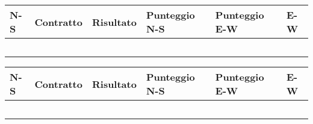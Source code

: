 \documentclass[a4paper,italian,12pt]{article}
\begin{document}
\begin{tcolorbox}
\begin{minipage}{.3\textwidth}
\newgame
{}

\hspace{-.2cm}\showAll
\end{minipage}
\begin{minipage}{.7\textwidth}

\renewcommand{\arraystretch}{2}
\begin{tabular}{|l|l|l|l|l|l|}
\hline
N-S & Contratto\hspace{1.5cm} & Risultato& Punteggio N-S & Punteggio E-W & E-W\\\hline
  &&&&&\\\hline
   &&&&&\\\hline
    &&&&&\\\hline
     &&&&&\\\hline
          &&&&&\\\hline
\end{tabular}
\end{minipage}
\end{tcolorbox}

\medskip

\begin{tcolorbox}
\begin{minipage}{.3\textwidth}
\newgame
{}

\hspace{-.2cm}\showAll
\end{minipage}
\begin{minipage}{.7\textwidth}

\renewcommand{\arraystretch}{2}
\begin{tabular}{|l|l|l|l|l|l|}
\hline
N-S & Contratto\hspace{1.5cm} & Risultato& Punteggio N-S & Punteggio E-W & E-W\\\hline
  &&&&&\\\hline
   &&&&&\\\hline
    &&&&&\\\hline
     &&&&&\\\hline
          &&&&&\\\hline
\end{tabular}
\end{minipage}
\end{tcolorbox}
\end{document}
